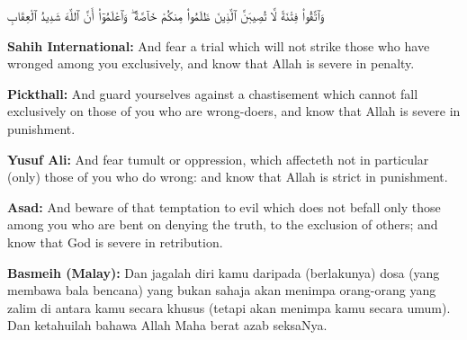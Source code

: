 \documentclass[11pt,a4paper,openany]{book}
\let\textAR\textarabic
\newcommand{\quranverse}[1]{{\centering\Large\textAR{#1}\par}}
\begin{document}
\begin{quranbox}[Qur'an 8:25]
\quranverse{وَٱتَّقُوا۟ فِتْنَةً لَّا تُصِيبَنَّ ٱلَّذِينَ ظَلَمُوا۟ مِنكُمْ خَآصَّةً ۖ وَٱعْلَمُوٓا۟ أَنَّ ٱللَّهَ شَدِيدُ ٱلْعِقَابِ}

\vspace{6pt}
\noindent\textbf{Sahih International:} And fear a trial which will not strike those who have wronged among you exclusively, and know that Allah is severe in penalty.

\vspace{4pt}
\noindent\textbf{Pickthall:} And guard yourselves against a chastisement which cannot fall exclusively on those of you who are wrong-doers, and know that Allah is severe in punishment.

\vspace{4pt}
\noindent\textbf{Yusuf Ali:} And fear tumult or oppression, which affecteth not in particular (only) those of you who do wrong: and know that Allah is strict in punishment.

\vspace{4pt}
\noindent\textbf{Asad:} And beware of that temptation to evil which does not befall only those among you who are bent on denying the truth, to the exclusion of others; and know that God is severe in retribution.

\vspace{4pt}
\noindent\textbf{Basmeih (Malay):} Dan jagalah diri kamu daripada (berlakunya) dosa (yang membawa bala bencana) yang bukan sahaja akan menimpa orang-orang yang zalim di antara kamu secara khusus (tetapi akan menimpa kamu secara umum). Dan ketahuilah bahawa Allah Maha berat azab seksaNya.
\end{quranbox}
\end{document}
